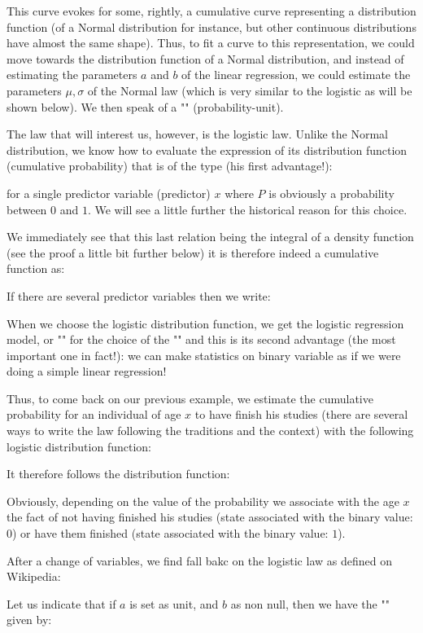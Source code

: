 	This curve evokes for some, rightly, a cumulative curve representing a distribution function (of a Normal distribution for instance, but other continuous distributions have almost the same shape). Thus, to fit a curve to this representation, we could move towards the distribution function of a Normal distribution, and instead of estimating the parameters $a$ and $b$ of the linear regression, we could estimate the parameters $\mu,\sigma$ of the Normal law (which is very similar to the logistic as will be shown below). We then speak of a "" (probability-unit).
	
	The law that will interest us, however, is the logistic law. Unlike the Normal distribution, we know how to evaluate the expression of its distribution function (cumulative probability) that is of the type (his first advantage!):
	
	for a single predictor variable (predictor) $x$ where $P$ is obviously a probability between $0$ and $1$. We will see a little further the historical reason for this choice.
	
	We immediately see that this last relation being the integral of a density function (see the proof a little bit further below) it is therefore indeed a cumulative function as:
	
	If there are several predictor variables then we write:
	
	When we choose the logistic distribution function, we get the logistic regression model, or "" for the choice of the "" and this is its second advantage (the most important one in fact!): we can make statistics on binary variable as if we were doing a simple linear regression!
	
	Thus, to come back on our previous example, we estimate the cumulative probability for an individual of age $x$ to have finish his studies (there are several ways to write the law following the traditions and the context) with the following logistic distribution function\label{logistic distribution}:
	
	It therefore follows the distribution function:
	
	Obviously, depending on the value of the probability we associate with the age $x$ the fact of not having finished his studies (state associated with the binary value: $0$) or have them finished (state associated with the binary value: $1$).	
	\begin{tcolorbox}[title=Remark,colframe=black,arc=10pt]
	After a change of variables, we find fall bakc on the logistic law as defined on Wikipedia:
	
	\end{tcolorbox}	
	Let us indicate that if $a$ is set as unit, and $b$ as non null, then we have the "" given by:
	
